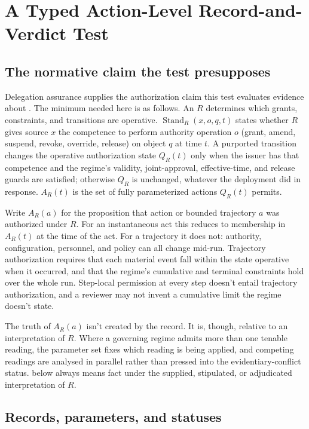 \section{A Typed Action-Level Record-and-Verdict Test}
\label{sec:sufficiency-test}

\subsection{The normative claim the test presupposes}

Delegation assurance supplies the authorization claim this test evaluates evidence about \citep{reynolds2026delegationAssurance}. The minimum needed here is as follows. An  \(R\) determines which grants, constraints, and transitions are operative. \(\operatorname{Stand}_R(x,o,q,t)\) states whether \(R\) gives source \(x\) the competence to perform authority operation \(o\) (grant, amend, suspend, revoke, override, release) on object \(q\) at time \(t\). A purported transition changes the operative authorization state \(Q_R(t)\) only when the issuer has that competence and the regime's validity, joint-approval, effective-time, and release guards are satisfied; otherwise \(Q_R\) is unchanged, whatever the deployment did in response. \(A_R(t)\) is the set of fully parameterized actions \(Q_R(t)\) permits.

Write \(A_R(a)\) for the proposition that action or bounded trajectory \(a\) was authorized under \(R\). For an instantaneous act this reduces to membership in \(A_R(t)\) at the time of the act. For a trajectory it does not: authority, configuration, personnel, and policy can all change mid-run. Trajectory authorization requires that each material event fall within the state operative when it occurred, and that the regime's cumulative and terminal constraints hold over the whole run. Step-local permission at every step doesn't entail trajectory authorization, and a reviewer may not invent a cumulative limit the regime doesn't state.

The truth of \(A_R(a)\) isn't created by the record. It is, though, relative to an interpretation of \(R\). Where a governing regime admits more than one tenable reading, the parameter set fixes which reading is being applied, and competing readings are analysed in parallel rather than pressed into the evidentiary-conflict status.  below always means fact under the supplied, stipulated, or adjudicated interpretation of \(R\).

\subsection{Records, parameters, and statuses}

